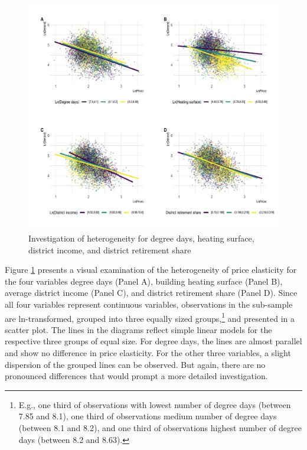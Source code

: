 \documentclass[12pt,twoside]{reedthesis}
\begin{document}
\newpage
\begin{figure}

{\centering \includegraphics[width=0.95\linewidth]{figure/other_variables_heterogeneity_plot} 

}

\caption{Investigation of heterogeneity for degree days, heating surface, district income, and district retirement share}\label{fig:other-variables-heterogeneity-plot}
\end{figure}
\noindent
Figure \ref{fig:other-variables-heterogeneity-plot} presents a visual examination of the heterogeneity of price elasticity for the four variables degree days (Panel A), building heating surface (Panel B), average district income (Panel C), and district retirement share (Panel D). Since all four variables represent continuous variables, observations in the sub-sample are ln-transformed, grouped into three equally sized groups,\footnote{E.g., one third of observations with lowest number of degree days (between 7.85 and 8.1), one third of observations medium number of degree days (between 8.1 and 8.2), and one third of observations highest number of degree days (between 8.2 and 8.63).} and presented in a scatter plot. The lines in the diagrams reflect simple linear models for the respective three groups of equal size. For degree days, the lines are almost parallel and show no difference in price elasticity. For the other three variables, a slight dispersion of the grouped lines can be observed. But again, there are no pronounced differences that would prompt a more detailed investigation.
\end{document}
